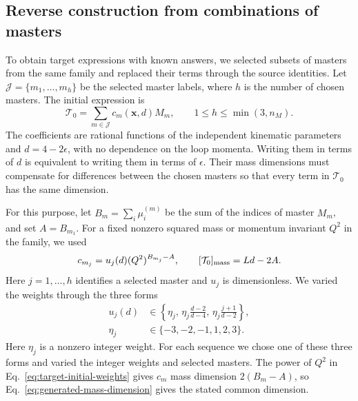 \documentclass[11pt,a4paper]{article}
\begin{document}
\subsection{Reverse construction from combinations of masters}
To obtain target expressions with known answers, we selected subsets
of masters from the same family and replaced their terms through the
source identities. Let $\mathcal J=\{m_1,\ldots,m_h\}$ be the selected
master labels, where $h$ is the number of chosen masters. The initial
expression is
\begin{equation}
 \mathcal T_0=\sum_{m\in\mathcal J}c_m(\boldsymbol x,d)M_m,
 \qquad 1\leq h\leq\min(3,n_M).
 \label{eq:generated-combination}
\end{equation}
The coefficients are rational functions of the independent kinematic
parameters and $d=4-2\epsilon$, with no dependence on the loop momenta.
Writing them in terms of $d$ is equivalent to writing them in terms
of $\epsilon$. Their mass dimensions must compensate for differences
between the chosen masters so that every term in $\mathcal T_0$ has
the same dimension.

For this purpose, let $B_m=\sum_i\mu_i^{(m)}$ be the sum of the indices
of master $M_m$, and set $A=B_{m_1}$. For a fixed nonzero squared mass
or momentum invariant $Q^2$ in the family, we used
\begin{equation}
 c_{m_j}=u_j(d)(Q^2)^{B_{m_j}-A},
 \qquad
 [\mathcal T_0]_{\rm mass}=Ld-2A.
 \label{eq:target-initial-weights}
\end{equation}
Here $j=1,\ldots,h$ identifies a selected master and $u_j$ is
dimensionless. We varied the weights through the three forms
\begin{equation}
 \begin{aligned}
 u_j(d)&\in\left\{\eta_j,\,
          \eta_j\frac{d-2}{d-4},\,
          \eta_j\frac{j+1}{d-2}\right\},\\
 \eta_j&\in\{-3,-2,-1,1,2,3\}.
 \end{aligned}
 \label{eq:target-dimensionless-weights}
\end{equation}
Here $\eta_j$ is a nonzero integer weight. For each sequence we chose
one of these three forms and varied the integer weights and selected
masters. The power of $Q^2$ in
Eq.~\eqref{eq:target-initial-weights} gives $c_m$ mass dimension
$2(B_m-A)$, so Eq.~\eqref{eq:generated-mass-dimension} gives the
stated common dimension.
\end{document}
